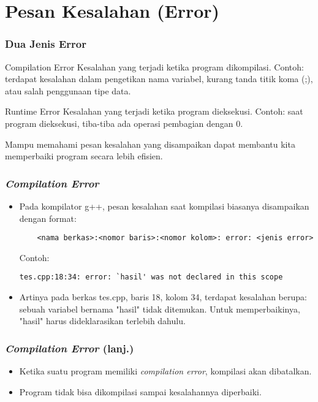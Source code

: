 \section{Pesan Kesalahan (Error)}
\frame{\sectionpage}

\begin{frame}
\frametitle{Dua Jenis Error}
\begin{block}{Compilation Error}
  Kesalahan yang terjadi ketika program dikompilasi.\newline
  Contoh: terdapat kesalahan dalam pengetikan nama variabel, kurang tanda titik koma (;), atau salah penggunaan tipe data.
\end{block}
\begin{block}{Runtime Error}
  Kesalahan yang terjadi ketika program dieksekusi.\newline
  Contoh: saat program dieksekusi, tiba-tiba ada operasi pembagian dengan 0.
\end{block}

Mampu memahami pesan kesalahan yang disampaikan dapat membantu kita memperbaiki program secara lebih efisien.
\end{frame}

\begin{frame}[fragile]
\frametitle{\textit{Compilation Error}}
\begin{itemize}
  \item Pada kompilator g++, pesan kesalahan saat kompilasi biasanya disampaikan dengan format:
  \begin{lstlisting}
    <nama berkas>:<nomor baris>:<nomor kolom>: error: <jenis error>
  \end{lstlisting}
  Contoh:
  \begin{lstlisting}[language={}]
    tes.cpp:18:34: error: `hasil' was not declared in this scope
  \end{lstlisting}
  \item Artinya pada berkas tes.cpp, baris 18, kolom 34, terdapat kesalahan berupa: sebuah variabel bernama "hasil" tidak ditemukan. Untuk memperbaikinya, "hasil" harus dideklarasikan terlebih dahulu.
\end{itemize}
\end{frame}

\begin{frame}[fragile]
\frametitle{\textit{Compilation Error} (lanj.)}
\begin{itemize}
  \item Ketika suatu program memiliki \textit{compilation error}, kompilasi akan dibatalkan.
  \item Program tidak bisa dikompilasi sampai kesalahannya diperbaiki.
\end{itemize}
\end{frame}

